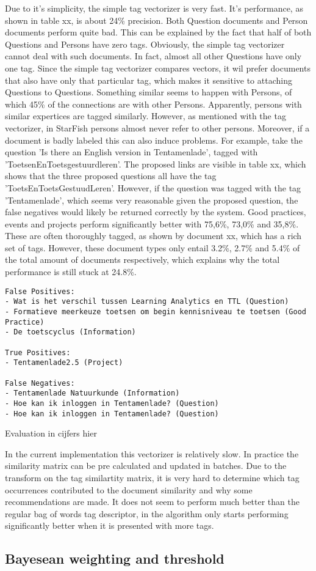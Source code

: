 Due to it's simplicity, the simple tag vectorizer is very fast. It's performance, as shown in table xx, is about 24\% precision. Both Question documents and Person documents perform quite bad. This can be explained by the fact that half of both Questions and Persons have zero tags. Obviously, the simple tag vectorizer cannot deal with such documents. In fact, almost all other Questions have only one tag. Since the simple tag vectorizer compares vectors, it wil prefer documents that also have only that particular tag, which makes it sensitive to attaching Questions to Questions. Something similar seems to happen with Persons, of which 45\% of the connections are with other Persons. Apparently, persons with similar expertices are tagged similarly. However, as mentioned with the tag vectorizer, in StarFish persons almost never refer to other persons. Moreover, if a document is badly labeled this can also induce problems. For example, take the question 'Is there an English version in Tentamenlade', tagged with 'ToetsenEnToetsgestuurdleren'. The proposed links are visible in table xx, which shows that  the three proposed questions all have the tag 'ToetsEnToetsGestuudLeren'. However, if the question was tagged with the tag 'Tentamenlade', which seems very reasonable given the proposed question, the false negatives would likely be returned correctly by the system. Good practices, events and projects perform significantly better with 75,6\%, 73,0\% and 35,8\%. These are often thoroughly tagged, as shown by document xx, which has a rich set of tags. However, these document types only entail 3.2\%, 2.7\% and 5.4\% of the total amount of documents respectively, which explains why the total performance is still stuck at 24.8\%. 

\begin{lstlisting}
False Positives:
- Wat is het verschil tussen Learning Analytics en TTL (Question)
- Formatieve meerkeuze toetsen om begin kennisniveau te toetsen (Good Practice)
- De toetscyclus (Information)

True Positives:
- Tentamenlade2.5 (Project)

False Negatives:
- Tentamenlade Natuurkunde (Information)
- Hoe kan ik inloggen in Tentamenlade? (Question)
- Hoe kan ik inloggen in Tentamenlade? (Question)
\end{lstlisting}

Evaluation in cijfers hier

In the current implementation this vectorizer is relatively slow. In practice the similarity matrix can be pre calculated and updated in batches. Due to the transform on the tag similartity matrix, it is very hard to determine which tag occurrences contributed to the document similarity and why some recommendations are made. It does not seem to perform much better than the regular bag of words tag descriptor, in \citeauthor{zhou2011web} the algorithm only starts performing significantly better when it is presented with more tags.

\subsection{Bayesean weighting and threshold}
